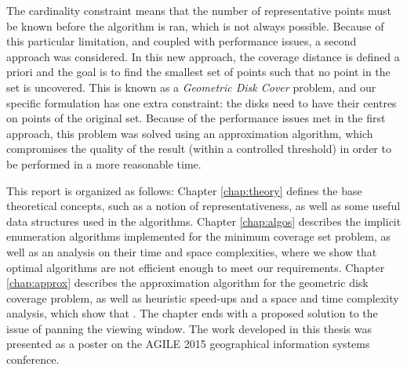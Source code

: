 The cardinality constraint means that the number of representative points must be known before the algorithm is ran, which is not always possible. Because of this particular limitation, and coupled with performance issues, a second approach was considered. In this new approach, the coverage distance is defined a priori and the goal is to find the smallest set of points such that no point in the set is uncovered. This is known as a \emph{Geometric Disk Cover} \cite{gdccomplex} problem, and our specific formulation has one extra constraint: the disks need to have their centres on points of the original set. Because of the performance issues met in the first approach, this problem was solved using an approximation algorithm, which compromises the quality of the result (within a controlled threshold) in order to be performed in a more reasonable time. 

\begin{change}
This report is organized as follows:
Chapter \ref{chap:theory} defines the base theoretical concepts, such as a notion of representativeness, as well as some useful data structures used in the algorithms. Chapter \ref{chap:algos} describes the implicit enumeration algorithms implemented for the minimum coverage set problem, as well as an analysis on their time and space complexities, where we show that optimal algorithms are not efficient enough to meet our requirements. Chapter \ref{chap:approx} describes the approximation algorithm for the geometric disk coverage problem, as well as heuristic speed-ups and a space and time complexity analysis, which show that . The chapter ends with a proposed solution to the issue of panning the viewing window. The work developed in this thesis was presented as a poster on the AGILE 2015 geographical information systems conference.
\end{change}